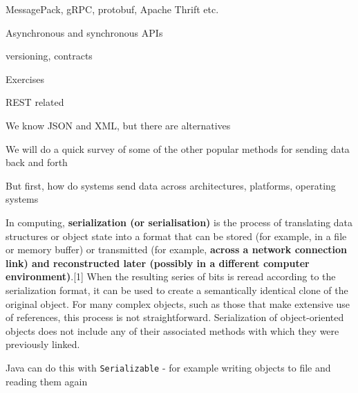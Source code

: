 \documentclass[Screen16to9,17pt]{foils}
\begin{document}

\begin{list2}
\item MessagePack, gRPC, protobuf, Apache Thrift etc.
\item Asynchronous and synchronous APIs
\item versioning, contracts
\end{list2}

Exercises
\begin{list2}
\item REST related
\item
\end{list2}





\begin{list2}
\item We know JSON and XML, but there are alternatives
\item We will do a quick survey of some of the other popular methods for sending data back and forth
\item But first, how do systems send data across architectures, platforms, operating systems
\end{list2}


\begin{quote}

\end{quote}
In computing, {\bf serialization (or serialisation)} is the process of translating data structures or object state into a format that can be stored (for example, in a file or memory buffer) or transmitted (for example, {\bf across a network connection link) and reconstructed later (possibly in a different computer environment)}.[1] When the resulting series of bits is reread according to the serialization format, it can be used to create a semantically identical clone of the original object. For many complex objects, such as those that make extensive use of references, this process is not straightforward. Serialization of object-oriented objects does not include any of their associated methods with which they were previously linked.
\begin{list2}
\item Java can do this with \verb+Serializable+ - for example writing objects to file and reading them again
\end{list2}
\end{document}

